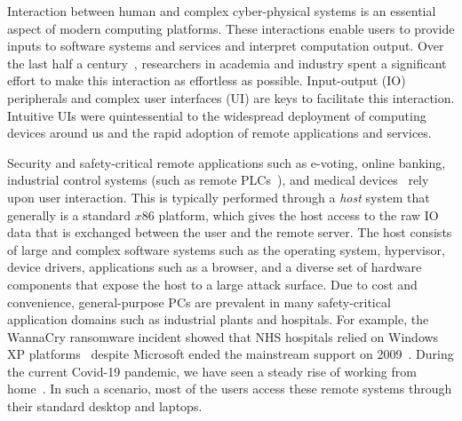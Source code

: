 Interaction between human and complex cyber-physical systems is an essential aspect of modern computing platforms. These interactions enable users to provide inputs to software systems and services and interpret computation output. Over the last half a century~\cite{hci_history_1,hci_history_2}, researchers in academia and industry spent a significant effort to make this interaction as effortless as possible. Input-output (IO) peripherals and complex user interfaces (UI) are keys to facilitate this interaction. Intuitive UIs were quintessential to the widespread deployment of computing devices around us and the rapid adoption of remote applications and services. 

Security and safety-critical remote applications such as e-voting, online banking, industrial control systems (such as remote PLCs~\cite{controlbyweb}), and medical devices~\cite{medicalDevice} rely upon user interaction. This is typically performed through a \emph{host} system that generally is a standard $x86$ platform, which gives the host access to the raw IO data that is exchanged between the user and the remote server. The host consists of large and complex software systems such as the operating system, hypervisor, device drivers, applications such as a browser, and a diverse set of hardware components that expose the host to a large attack surface. Due to cost and convenience, general-purpose PCs are prevalent in many safety-critical application domains such as industrial plants and hospitals. For example, the WannaCry ransomware incident showed that NHS hospitals relied on Windows XP platforms~\cite{berry_2017,field_wannacry_2018} despite Microsoft ended the mainstream support on 2009~\cite{xp_support}. During the current Covid-19 pandemic, we have seen a steady rise of working from home~\cite{covid_work}. In such a scenario, most of the users access these remote systems through their standard desktop and laptops.



